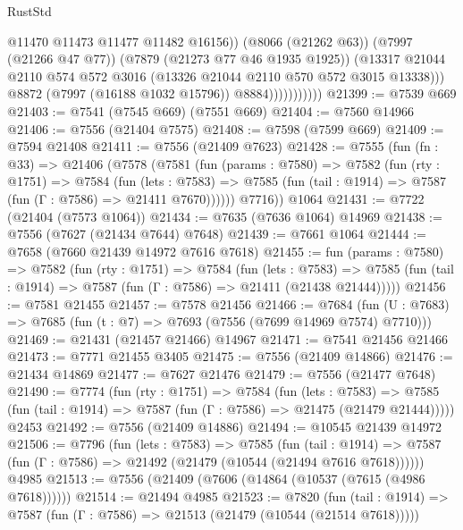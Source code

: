 \begin{lexlean}{RustStd}
\begin{coremodule}
{\begin{coremodule}
{{{{{{{{{{{{{{{{{{{{{{{{{{{{{{{{{{{{{{{{{{{                                @11470
                                @11473
                                @11477
                                @11482
                                @16156))
                            (@8066 (@21262 @63))
                            (@7997 (@21266 @47 @77))
                            (@7879 (@21273 @77 @46 @1935 @1925))
                            (@13317
                              @21044
                              @2110
                              @574
                              @572
                              @3016
                              (@13326 @21044 @2110 @570 @572 @3015 @13338)))
                          @8872
                          (@7997 (@16188 @1032 @15796))
                          @8884)))))))))))
@21399 := @7539 @669
@21403 := @7541 (@7545 @669) (@7551 @669)
@21404 := @7560 @14966
@21406 := @7556 (@21404 @7575)
@21408 := @7598 (@7599 @669)
@21409 := @7594 @21408
@21411 := @7556 (@21409 @7623)
@21428 := @7555
    (fun (fn : @33) =>
    @21406
      (@7578
        (@7581
          (fun (params : @7580) =>
          @7582
            (fun (rty : @1751) =>
            @7584
              (fun (lets : @7583) =>
              @7585 (fun (tail : @1914) => @7587 (fun (Γ : @7586) => @21411 @7670))))))
        @7716))
    @1064
@21431 := @7722 (@21404 (@7573 @1064))
@21434 := @7635 (@7636 @1064) @14969
@21438 := @7556 (@7627 (@21434 @7644) @7648)
@21439 := @7661 @1064
@21444 := @7658 (@7660 @21439 @14972 @7616 @7618)
@21455 := fun (params : @7580) =>
  @7582
    (fun (rty : @1751) =>
    @7584
      (fun (lets : @7583) =>
      @7585 (fun (tail : @1914) => @7587 (fun (Γ : @7586) => @21411 (@21438 @21444)))))
@21456 := @7581 @21455
@21457 := @7578 @21456
@21466 := @7684
    (fun (U : @7683) => @7685 (fun (t : @7) => @7693 (@7556 (@7699 @14969 @7574) @7710)))
@21469 := @21431 (@21457 @21466) @14967
@21471 := @7541 @21456 @21466
@21473 := @7771 @21455 @3405
@21475 := @7556 (@21409 @14866)
@21476 := @21434 @14869
@21477 := @7627 @21476
@21479 := @7556 (@21477 @7648)
@21490 := @7774
    (fun (rty : @1751) =>
    @7584
      (fun (lets : @7583) =>
      @7585 (fun (tail : @1914) => @7587 (fun (Γ : @7586) => @21475 (@21479 @21444)))))
    @2453
@21492 := @7556 (@21409 @14886)
@21494 := @10545 @21439 @14972
@21506 := @7796
    (fun (lets : @7583) =>
    @7585
      (fun (tail : @1914) =>
      @7587 (fun (Γ : @7586) => @21492 (@21479 (@10544 (@21494 @7616 @7618))))))
    @4985
@21513 := @7556 (@21409 (@7606 (@14864 (@10537 (@7615 (@4986 @7618))))))
@21514 := @21494 @4985
@21523 := @7820
    (fun (tail : @1914) => @7587 (fun (Γ : @7586) => @21513 (@21479 (@10544 (@21514 @7618)))))
}}}}}}}}}}}}}}}}}}}}}}}}}}}}}}}}}}}}}}}}}}}
\end{coremodule}}
\end{coremodule}
\end{lexlean}
